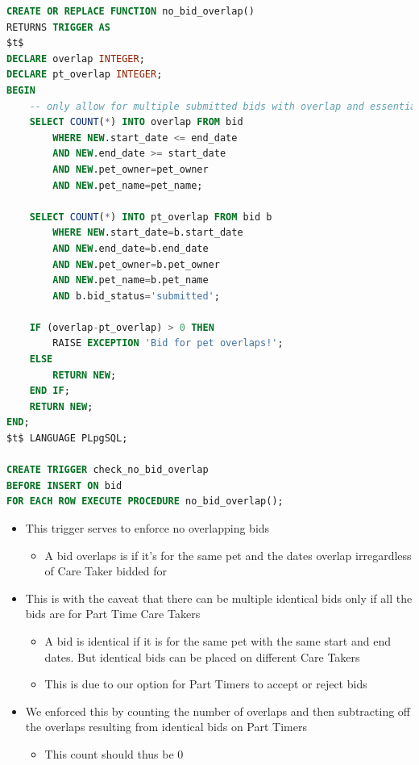 \documentclass[
  paper=a4,
  ,captions=tableheading
]{scrartcl}
\providecommand{\tightlist}{%
  \setlength{\itemsep}{0pt}\setlength{\parskip}{0pt}}
\begin{document}
\begin{lstlisting}[language=SQL]
CREATE OR REPLACE FUNCTION no_bid_overlap()
RETURNS TRIGGER AS 
$t$
DECLARE overlap INTEGER;
DECLARE pt_overlap INTEGER;
BEGIN
    -- only allow for multiple submitted bids with overlap and essentially are the same bid
    SELECT COUNT(*) INTO overlap FROM bid
        WHERE NEW.start_date <= end_date
        AND NEW.end_date >= start_date
        AND NEW.pet_owner=pet_owner
        AND NEW.pet_name=pet_name;

    SELECT COUNT(*) INTO pt_overlap FROM bid b
        WHERE NEW.start_date=b.start_date
        AND NEW.end_date=b.end_date
        AND NEW.pet_owner=b.pet_owner
        AND NEW.pet_name=b.pet_name
        AND b.bid_status='submitted';

    IF (overlap-pt_overlap) > 0 THEN
        RAISE EXCEPTION 'Bid for pet overlaps!';
    ELSE
        RETURN NEW;
    END IF;
    RETURN NEW;
END;
$t$ LANGUAGE PLpgSQL;

CREATE TRIGGER check_no_bid_overlap
BEFORE INSERT ON bid
FOR EACH ROW EXECUTE PROCEDURE no_bid_overlap();
\end{lstlisting}

\begin{itemize}
\tightlist
\item
  This trigger serves to enforce no overlapping bids

  \begin{itemize}
  \tightlist
  \item
    A bid overlaps is if it's for the same pet and the dates overlap
    irregardless of Care Taker bidded for
  \end{itemize}
\item
  This is with the caveat that there can be multiple identical bids only
  if all the bids are for Part Time Care Takers

  \begin{itemize}
  \tightlist
  \item
    A bid is identical if it is for the same pet with the same start and
    end dates. But identical bids can be placed on different Care Takers
  \item
    This is due to our option for Part Timers to accept or reject bids
  \end{itemize}
\item
  We enforced this by counting the number of overlaps and then
  subtracting off the overlaps resulting from identical bids on Part
  Timers

  \begin{itemize}
  \tightlist
  \item
    This count should thus be 0
  \end{itemize}
\end{itemize}
\end{document}
